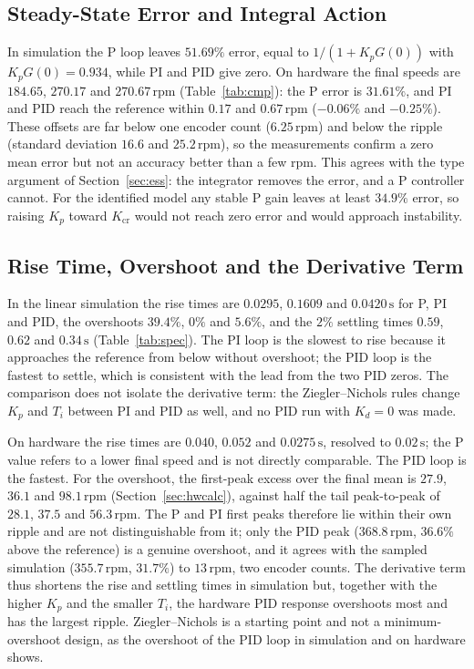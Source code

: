 \documentclass[lettersize,journal]{IEEEtran}
\newcommand{\Kcr}{K_{\mathrm{cr}}}
\newcommand{\rpm}{\,\text{rpm}}
\begin{document}
\subsection{Steady-State Error and Integral Action}
In simulation the P loop leaves $51.69\%$ error, equal to $1/(1+K_pG(0))$ with $K_pG(0)=0.934$, while PI and PID give zero. On hardware the final speeds are $184.65$, $270.17$ and $270.67\rpm$ (Table~\ref{tab:cmp}): the P error is $31.61\%$, and PI and PID reach the reference within $0.17$ and $0.67\rpm$ ($-0.06\%$ and $-0.25\%$). These offsets are far below one encoder count ($6.25\rpm$) and below the ripple (standard deviation $16.6$ and $25.2\rpm$), so the measurements confirm a zero mean error but not an accuracy better than a few rpm. This agrees with the type argument of Section~\ref{sec:ess}: the integrator removes the error, and a P controller cannot. For the identified model any stable P gain leaves at least $34.9\%$ error, so raising $K_p$ toward $\Kcr$ would not reach zero error and would approach instability.

\subsection{Rise Time, Overshoot and the Derivative Term}
In the linear simulation the rise times are $0.0295$, $0.1609$ and $0.0420\,\text{s}$ for P, PI and PID, the overshoots $39.4\%$, $0\%$ and $5.6\%$, and the $2\%$ settling times $0.59$, $0.62$ and $0.34\,\text{s}$ (Table~\ref{tab:spec}). The PI loop is the slowest to rise because it approaches the reference from below without overshoot; the PID loop is the fastest to settle, which is consistent with the lead from the two PID zeros. The comparison does not isolate the derivative term: the Ziegler--Nichols rules change $K_p$ and $T_i$ between PI and PID as well, and no PID run with $K_d=0$ was made.

On hardware the rise times are $0.040$, $0.052$ and $0.0275\,\text{s}$, resolved to $0.02\,\text{s}$; the P value refers to a lower final speed and is not directly comparable. The PID loop is the fastest. For the overshoot, the first-peak excess over the final mean is $27.9$, $36.1$ and $98.1\rpm$ (Section~\ref{sec:hwcalc}), against half the tail peak-to-peak of $28.1$, $37.5$ and $56.3\rpm$. The P and PI first peaks therefore lie within their own ripple and are not distinguishable from it; only the PID peak ($368.8\rpm$, $36.6\%$ above the reference) is a genuine overshoot, and it agrees with the sampled simulation ($355.7\rpm$, $31.7\%$) to $13\rpm$, two encoder counts. The derivative term thus shortens the rise and settling times in simulation but, together with the higher $K_p$ and the smaller $T_i$, the hardware PID response overshoots most and has the largest ripple. Ziegler--Nichols is a starting point and not a minimum-overshoot design, as the overshoot of the PID loop in simulation and on hardware shows.
\end{document}
